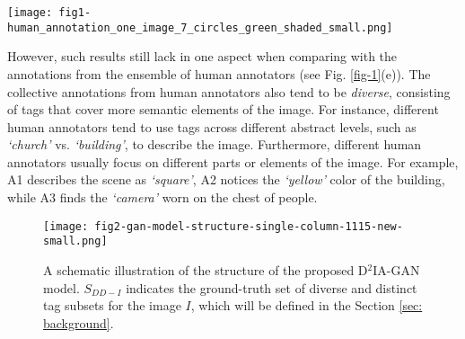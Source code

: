 \documentclass[10pt,twocolumn,letterpaper]{article}
\begin{document}
\begin{figure*}[t]
\centering
\texttt{[image: fig1-human\_annotation\_one\_image\_7\_circles\_green\_shaded\_small.png]}
\caption{{\bf An example illustrating the diversity and distinctiveness in image annotation}. The image \textbf{(a)} is from IAPRTC-12 \cite{iaprtc-12-data-2006}.
We present the tagging results from 3 independent human annotators \textbf{(v)}-\textbf{(d)}, identified as A1, A2, A3, respectively, as well as their ensemble result \textbf{(e)}. 
We also present the results of some automatic annotation methods. ML-MG \cite{my-iccv-2015} \textbf{(f)} is a standard annotation method that requires the relevant tags. 
DIA (ensemble) \cite{my-cvpr-2017-dia} \textbf{(g)} indicates that we repeat the sampling of DIA for 3 times, with the requirement that each subset includes at most 5 tags, and then combine these 3 subsets to one ensemble subset. 
Similarly, we obtain the ensemble subset of our method \textbf{(h)}.   
In each graph, nodes are candidate tags and the arrows connect parent and child tags in the semantic hierarchy. 
%
This figure is better viewed in color.}
\label{fig-1}
\vspace{-1em}
\end{figure*}

However, such results still lack in one aspect when comparing with the annotations from the ensemble of human annotators (see Fig. \ref{fig-1}(e)). The collective annotations from human annotators also tend to be {\em diverse}, consisting of tags that cover more semantic elements of the image. For instance, different human annotators tend to use tags across different abstract levels, such as {\it `church'} vs. {\it `building'}, to describe the image. Furthermore, different human annotators usually focus on different parts or elements of the image. For example, A1 describes the scene as {\it `square'}, A2 notices the {\it `yellow'} color of the building, while A3 finds the {\it `camera'} worn on the chest of people. 



\begin{figure}[t]
\centering
\texttt{[image: fig2-gan-model-structure-single-column-1115-new-small.png]}
\caption{A schematic illustration of the structure of the proposed D$^2$IA-GAN model. $S_{DD-I}$ indicates the ground-truth set of diverse and distinct tag subsets for the image $I$, which will be defined in the Section \ref{sec: background}.}
\label{fig-2}
\vspace{-.2in}
\end{figure}
\end{document}

